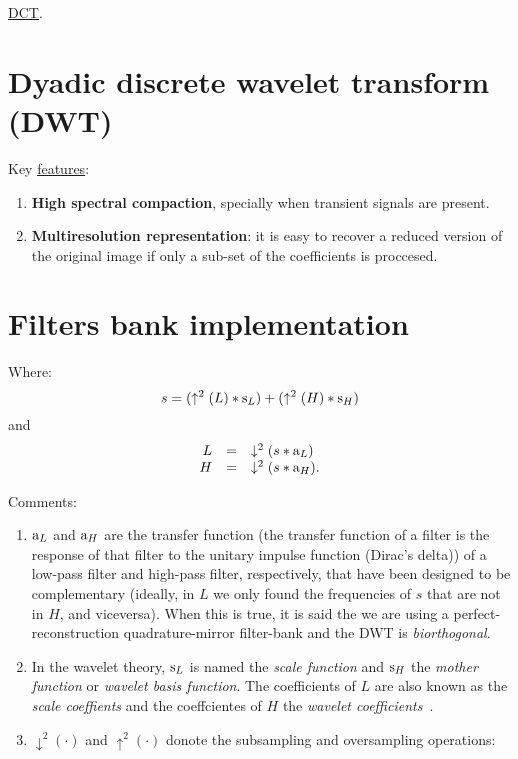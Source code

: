 \href{https://nbviewer.jupyter.org/github/vicente-gonzalez-ruiz/image_transformations_for_coding/blob/master/DCT.ipynb}{DCT}.

\section{Dyadic discrete wavelet transform (DWT)}
Key \href{https://en.wikipedia.org/wiki/Discrete_wavelet_transform}{features}:

\begin{enumerate}
\tightlist
\item
  \textbf{High spectral compaction}, specially when transient signals
  are present.
\item
  \textbf{Multiresolution representation}: it is easy to recover a
  reduced version of the original image if only a sub-set of the
  coefficients is proccesed.
\end{enumerate}

\section{Filters bank implementation}
Where: \begin{equation}
  s = (\uparrow^2(L)*{\text s}_L) + (\uparrow^2(H)*{\text s}_H)
\end{equation} and \begin{equation}
  \begin{array}{rcl}
    L & = & \downarrow^2(s*{\text a}_L) \\
    H & = & \downarrow^2(s*{\text a}_H).
  \end{array}
\end{equation}

Comments:

\begin{enumerate}
\item
  \({\text a}_L\) and \({\text a}_H\) are the transfer function (the
  transfer function of a filter is the response of that filter to the
  unitary impulse function (Dirac's delta)) of a low-pass filter and
  high-pass filter, respectively, that have been designed to be
  complementary (ideally, in \(L\) we only found the frequencies of
  \(s\) that are not in \(H\), and viceversa). When this is true, it is
  said the we are using a perfect-reconstruction quadrature-mirror
  filter-bank and the DWT is \emph{biorthogonal}.
\item
  In the wavelet theory, \({\text s}_L\) is named the \emph{scale
  function} and \({\text s}_H\) the \emph{mother function} or
  \emph{wavelet basis function}. The coefficients of \(L\) are also
  known as the \emph{scale coeffients} and the coeffcientes of \(H\) the
  \emph{wavelet coefficients}~\cite{sovic2012signal}.
\item
  \(\downarrow^2(\cdot)\) and \(\uparrow^2(\cdot)\) donote the
  subsampling and oversampling operations:
\end{enumerate}

